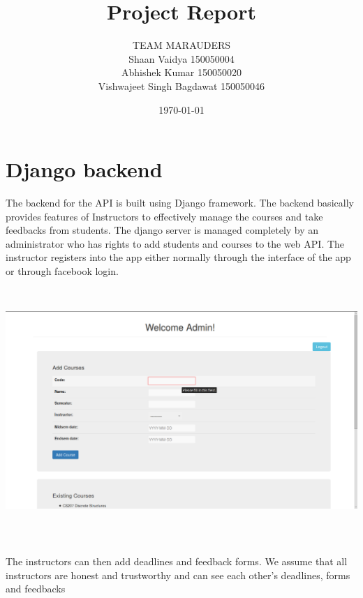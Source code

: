 \documentclass{article}
\title{Project Report}
\author{TEAM MARAUDERS\\
		Shaan Vaidya 150050004\\
		Abhishek Kumar 150050020\\
		Vishwajeet Singh Bagdawat 150050046\\
		}
\date{\today}
\begin{document}
	\maketitle

\newpage

\section{Django backend}
	The backend for the API is built using Django framework. The backend basically provides features of Instructors to effectively manage the courses and take feedbacks from students. The django server is managed completely by an administrator who has rights to add students and courses to the web API. The instructor registers into the app either normally through the interface of the app or through facebook login.
\newline
\newline
\includegraphics[width=15cm, height=10cm]{photos/addcourse.png}

	The instructors can then add deadlines and feedback forms.
	We assume that all instructors are honest and trustworthy and can see each other's deadlines, forms and feedbacks
\newpage
\end{document}
